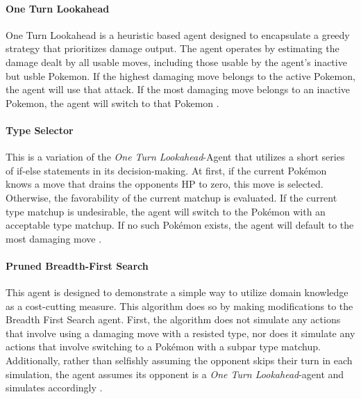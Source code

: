 \paragraph{One Turn Lookahead}
One Turn Lookahead is a heuristic based agent designed to encapsulate a greedy strategy that 
prioritizes damage output. The agent operates by estimating the damage dealt by all usable moves, 
including those usable by the agent's inactive but usble Pokemon. If the highest damaging move 
belongs to the active Pokemon, the agent will use that attack. If the most damaging move belongs to 
an inactive Pokemon, the agent will switch to that Pokemon \cite{Lee_Togelius_2017}.

\paragraph{Type Selector}
This is a variation of the \textit{One Turn Lookahead}-Agent that utilizes a short series of
if-else statements in its decision-making. At first, if the current Pokémon knows a move 
that drains the opponents \ac{HP} to zero, this move is selected. Otherwise, the 
favorability of the current matchup is evaluated. If the current type matchup is 
undesirable, the agent will switch to the Pokémon with an acceptable type matchup. If no
such Pokémon exists, the agent will default to the most damaging move 
\cite{Lee_Togelius_2017}.

\paragraph{Pruned Breadth-First Search}
This agent is designed to demonstrate a simple way to utilize domain knowledge as a cost-cutting 
measure. This algorithm does so by making modifications to the Breadth First Search agent. First, 
the algorithm does not simulate any actions that involve using a damaging move with a resisted type, 
nor does it simulate any actions that involve switching to a Pokémon with a subpar type matchup. 
Additionally, rather than selfishly assuming the opponent skips their turn in each simulation, the 
agent assumes its opponent is a \emph{One Turn Lookahead}-agent and simulates accordingly \cite{Lee_Togelius_2017}.

